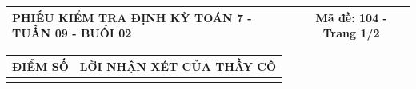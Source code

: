 \documentclass[12pt,a4paper]{article}
\begin{document}
\newpage
\noindent
\begin{tabularx}{\linewidth}{|X|c|}
\hline
\textbf{PHIẾU KIỂM TRA ĐỊNH KỲ TOÁN 7 - TUẦN 09 - BUỔI 02} & \textbf{Mã đề: 104 - Trang 1/2} \\
\hline
\end{tabularx}

\vspace{1.2mm}

\noindent
\begin{tabularx}{\linewidth}{|p{3.2cm}|X|}
\hline
\centering\textbf{ĐIỂM SỐ} & \centering\textbf{LỜI NHẬN XÉT CỦA THẦY CÔ} \tabularnewline
\hline
\rule{0pt}{1.8cm} & \tabularnewline
\hline
\end{tabularx}
\end{document}
